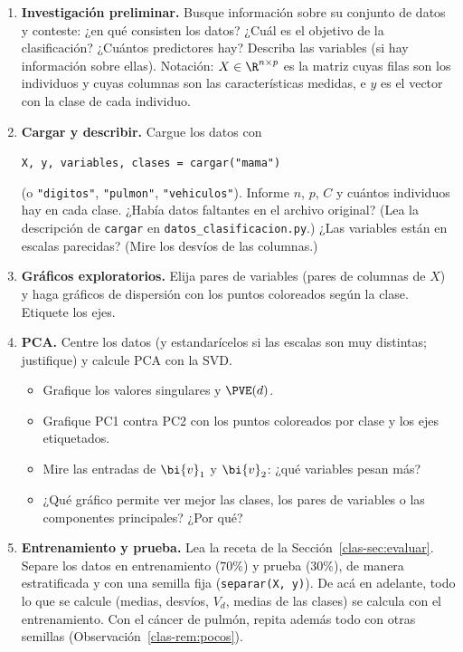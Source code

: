 \begin{enumerate}[leftmargin=*,label=\textbf{P.\arabic*},ref=P.\arabic*,itemsep=6pt]

\item \textbf{Investigación preliminar.} Busque información sobre su conjunto
de datos y conteste: ¿en qué consisten los datos? ¿Cuál es el objetivo de la
clasificación? ¿Cuántos predictores hay? Describa las variables (si hay
información sobre ellas).
Notación: $X\in\R^{n\times p}$ es la matriz cuyas filas son los individuos y
cuyas columnas son las características medidas, e $y$ es el vector con la
clase de cada individuo.

\item \textbf{Cargar y describir.} Cargue los datos con
\begin{center}
\texttt{X, y, variables, clases = cargar("mama")}
\end{center}
(o \texttt{"digitos"}, \texttt{"pulmon"}, \texttt{"vehiculos"}). Informe $n$, $p$, $C$ y cuántos
individuos hay en cada clase. ¿Había datos faltantes en el archivo original?
(Lea la descripción de \texttt{cargar} en \texttt{datos\_clasificacion.py}.) ¿Las
variables están en escalas parecidas? (Mire los desvíos de las columnas.)

\item \textbf{Gráficos exploratorios.} Elija pares de variables (pares de
columnas de $X$) y haga gráficos de dispersión con los puntos coloreados según
la clase. Etiquete los ejes.

\item \textbf{PCA.}\label{clas-p:pca} Centre los datos (y estandarícelos si
las escalas son muy distintas; justifique) y calcule PCA con la SVD.
\begin{itemize}[itemsep=1pt]
\item Grafique los valores singulares y $\PVE(d)$.
\item Grafique PC1 contra PC2 con los puntos coloreados por clase y los ejes
etiquetados.
\item Mire las entradas de $\bi{v}_1$ y $\bi{v}_2$: ¿qué variables pesan más?
\item ¿Qué gráfico permite ver mejor las clases, los pares de variables o las
componentes principales? ¿Por qué?
\end{itemize}

\item \textbf{Entrenamiento y prueba.} Lea la receta de la
Sección~\ref{clas-sec:evaluar}. Separe los datos en entrenamiento ($70\%$) y
prueba ($30\%$), de manera estratificada y con una semilla fija
(\texttt{separar(X, y)}). De acá en adelante, todo lo que se calcule (medias,
desvíos, $V_d$, medias de las clases) se calcula con el entrenamiento. Con el
cáncer de pulmón, repita además todo con otras semillas
(Observación~\ref{clas-rem:pocos}).


\end{enumerate}
